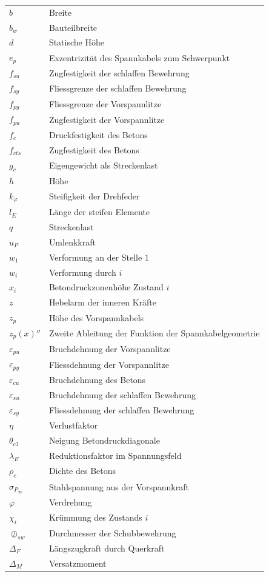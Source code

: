 \documentclass[
  11pt,
  letterpaper,
]{scrreprt}
\begin{document}
\begin{longtable}[]{@{}
  >{\raggedright\arraybackslash}p{}
  >{\raggedright\arraybackslash}p{}@{}}
\(b\) & Breite \\
\(b_w\) & Bauteilbreite \\
\(d\) & Statische Höhe \\
\(e_{p}\) & Exzentrizität des Spannkabels zum Schwerpunkt \\
\(f_{su}\) & Zugfestigkeit der schlaffen Bewehrung \\
\(f_{sy}\) & Fliessgrenze der schlaffen Bewehrung \\
\(f_{py}\) & Fliessgrenze der Vorspannlitze \\
\(f_{pu}\) & Zugfestigkeit der Vorspannlitze \\
\(f_{c}\) & Druckfestigkeit des Betons \\
\(f_{cts}\) & Zugfestigkeit des Betons \\
\(g_c\) & Eigengewicht als Streckenlast \\
\(h\) & Höhe \\
\(k_{\varphi}\) & Steifigkeit der Drehfeder \\
\(l_E\) & Länge der steifen Elemente \\
\(q\) & Streckenlast \\
\(u_P\) & Umlenkkraft \\
\(w_1\) & Verformung an der Stelle \(1\) \\
\(w_i\) & Verformung durch \(i\) \\
\(x_i\) & Betondruckzonenhöhe Zustand \(i\) \\
\(z\) & Hebelarm der inneren Kräfte \\
\(z_p\) & Höhe des Vorspannkabels \\
\(z_p(x)''\) & Zweite Ableitung der Funktion der Spannkabelgeometrie \\
\(\varepsilon_{pu}\) & Bruchdehnung der Vorspannlitze \\
\(\varepsilon_{py}\) & Fliessdehnung der Vorspannlitze \\
\(\varepsilon_{cu}\) & Bruchdehnung des Betons \\
\(\varepsilon_{su}\) & Bruchdehnung der schlaffen Bewehrung \\
\(\varepsilon_{sy}\) & Fliessdehnung der schlaffen Bewehrung \\
\(\eta\) & Verlustfaktor \\
\(\theta_{c3}\) & Neigung Betondruckdiagonale \\
\(\lambda_E\) & Reduktionsfaktor im Spannungsfeld \\
\(\rho_c\) & Dichte des Betons \\
\(\sigma_{P_\infty}\) & Stahlspannung aus der Vorspannkraft \\
\(\varphi\) & Verdrehung \\
\(\chi_i\) & Krümmung des Zustands \(i\) \\
\(\oslash_{sw}\) & Durchmesser der Schubbewehrung \\
\(\Delta_F\) & Längszugkraft durch Querkraft \\
\(\Delta_M\) & Versatzmoment \\
\end{longtable}
\end{document}
